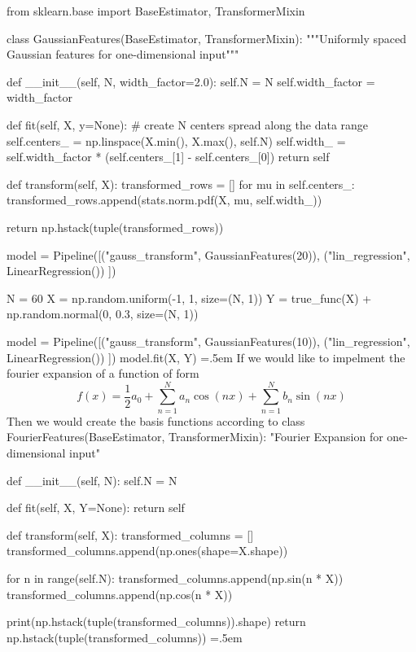 \documentclass{article}
\theoremstyle{definition}
\newenvironment{cverbatim}
    {\SaveVerbatim{cverb}}
    {\endSaveVerbatim
    \flushleft\fboxrule=0pt\fboxsep=.5em
    \colorbox{cverbbg}{%
      \makebox[\dimexpr\linewidth-2\fboxsep][l]{\BUseVerbatim{cverb}}%
    }
    \endflushleft
  }
\begin{document}
    \begin{cverbatim}
    from sklearn.base import BaseEstimator, TransformerMixin

    class GaussianFeatures(BaseEstimator, TransformerMixin):
        """Uniformly spaced Gaussian features for one-dimensional input"""
        
        def __init__(self, N, width_factor=2.0):
            self.N = N
            self.width_factor = width_factor
            
        def fit(self, X, y=None):
            # create N centers spread along the data range
            self.centers_ = np.linspace(X.min(), X.max(), self.N)
            self.width_ = self.width_factor * (self.centers_[1] - self.centers_[0])
            return self
            
        def transform(self, X): 
            transformed_rows = []
            for mu in self.centers_: 
                transformed_rows.append(stats.norm.pdf(X, mu, self.width_))
            
            return np.hstack(tuple(transformed_rows))

    model = Pipeline([("gauss_transform", GaussianFeatures(20)), 
                      ("lin_regression", LinearRegression())
                      ]) 

    N = 60
    X = np.random.uniform(-1, 1, size=(N, 1)) 
    Y = true_func(X) + np.random.normal(0, 0.3, size=(N, 1)) 

    model = Pipeline([("gauss_transform", GaussianFeatures(10)), 
                  ("lin_regression", LinearRegression())
                  ]) 
    model.fit(X, Y)
    \end{cverbatim} 
    If we would like to impelment the fourier expansion of a function of form 
    \[f(x) = \frac{1}{2} a_0 + \sum_{n=1}^N a_n \cos(n x) + \sum_{n=1}^N b_n \sin(n x)\]
    Then we would create the basis functions according to 
    \begin{cverbatim}
    class FourierFeatures(BaseEstimator, TransformerMixin): 
        "Fourier Expansion for one-dimensional input"
        
        def __init__(self, N): 
            self.N = N 
            
        def fit(self, X, Y=None): 
            return self
        
        def transform(self, X): 
            transformed_columns = [] 
            transformed_columns.append(np.ones(shape=X.shape))
            
            for n in range(self.N): 
                transformed_columns.append(np.sin(n * X))
                transformed_columns.append(np.cos(n * X))
                
            print(np.hstack(tuple(transformed_columns)).shape)
            return np.hstack(tuple(transformed_columns))
    \end{cverbatim} 
\end{document}
